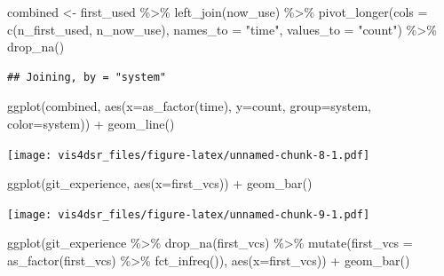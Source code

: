 \documentclass[
]{krantz}
\makeatletter
\newenvironment{Shaded}{\begin{snugshade}}{\end{snugshade}}
\newcommand{\AttributeTok}[1]{\textcolor[rgb]{0.61,0.61,0.61}{#1}}
\newcommand{\FunctionTok}[1]{\textcolor[rgb]{0,0,0}{#1}}
\newcommand{\NormalTok}[1]{#1}
\newcommand{\OtherTok}[1]{\textcolor[rgb]{0.37,0.37,0.37}{#1}}
\newcommand{\SpecialCharTok}[1]{\textcolor[rgb]{0,0,0}{#1}}
\newcommand{\StringTok}[1]{\textcolor[rgb]{0.5,0.5,0.5}{#1}}
\newenvironment{kframe}{%
\medskip{}
\setlength{\fboxsep}{.8em}
 \def\at@end@of@kframe{}%
 \ifinner\ifhmode%
  \def\at@end@of@kframe{\end{minipage}}%
  \begin{minipage}{\columnwidth}%
 \fi\fi%
 \def\FrameCommand##1{\hskip\@totalleftmargin \hskip-\fboxsep
 \colorbox{shadecolor}{##1}\hskip-\fboxsep
     \hskip-\linewidth \hskip-\@totalleftmargin \hskip\columnwidth}%
 \MakeFramed {\advance\hsize-\width
   \@totalleftmargin\z@ \linewidth\hsize
   \@setminipage}}%
 {\par\unskip\endMakeFramed%
 \at@end@of@kframe}
\renewenvironment{Shaded}{\begin{kframe}}{\end{kframe}}
\makeatother
\begin{document}
\begin{Shaded}
\begin{Highlighting}[]
\NormalTok{combined }\OtherTok{\textless{}{-}}\NormalTok{ first\_used }\SpecialCharTok{\%\textgreater{}\%} \FunctionTok{left\_join}\NormalTok{(now\_use) }\SpecialCharTok{\%\textgreater{}\%}
  \FunctionTok{pivot\_longer}\NormalTok{(}\AttributeTok{cols =} \FunctionTok{c}\NormalTok{(n\_first\_used, n\_now\_use), }
               \AttributeTok{names\_to =} \StringTok{"time"}\NormalTok{,}
               \AttributeTok{values\_to =} \StringTok{"count"}\NormalTok{) }\SpecialCharTok{\%\textgreater{}\%}
  \FunctionTok{drop\_na}\NormalTok{()}
\end{Highlighting}
\end{Shaded}

\begin{verbatim}
## Joining, by = "system"
\end{verbatim}

\begin{Shaded}
\begin{Highlighting}[]
\FunctionTok{ggplot}\NormalTok{(combined, }\FunctionTok{aes}\NormalTok{(}\AttributeTok{x=}\FunctionTok{as\_factor}\NormalTok{(time), }\AttributeTok{y=}\NormalTok{count, }\AttributeTok{group=}\NormalTok{system, }\AttributeTok{color=}\NormalTok{system)) }\SpecialCharTok{+}
  \FunctionTok{geom\_line}\NormalTok{()}
\end{Highlighting}
\end{Shaded}

\texttt{[image: vis4dsr\_files/figure-latex/unnamed-chunk-8-1.pdf]}

\begin{Shaded}
\begin{Highlighting}[]
\FunctionTok{ggplot}\NormalTok{(git\_experience, }\FunctionTok{aes}\NormalTok{(}\AttributeTok{x=}\NormalTok{first\_vcs)) }\SpecialCharTok{+}
  \FunctionTok{geom\_bar}\NormalTok{()}
\end{Highlighting}
\end{Shaded}

\texttt{[image: vis4dsr\_files/figure-latex/unnamed-chunk-9-1.pdf]}

\begin{Shaded}
\begin{Highlighting}[]
\FunctionTok{ggplot}\NormalTok{(git\_experience }\SpecialCharTok{\%\textgreater{}\%}
         \FunctionTok{drop\_na}\NormalTok{(first\_vcs) }\SpecialCharTok{\%\textgreater{}\%}
         \FunctionTok{mutate}\NormalTok{(}\AttributeTok{first\_vcs =} \FunctionTok{as\_factor}\NormalTok{(first\_vcs) }\SpecialCharTok{\%\textgreater{}\%} 
             \FunctionTok{fct\_infreq}\NormalTok{()), }
         \FunctionTok{aes}\NormalTok{(}\AttributeTok{x=}\NormalTok{first\_vcs)) }\SpecialCharTok{+}
  \FunctionTok{geom\_bar}\NormalTok{()}
\end{Highlighting}
\end{Shaded}
\end{document}

